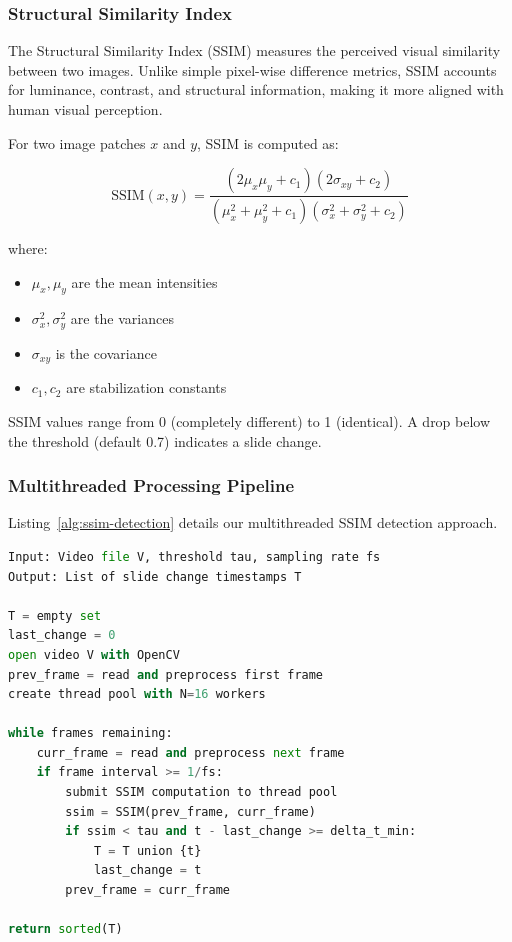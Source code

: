 \documentclass[12pt,a4paper]{article}
\begin{document}
\subsubsection{Structural Similarity Index}

The Structural Similarity Index (SSIM) \cite{wang2004image} measures the perceived visual similarity between two images. Unlike simple pixel-wise difference metrics, SSIM accounts for luminance, contrast, and structural information, making it more aligned with human visual perception.

For two image patches $x$ and $y$, SSIM is computed as:

\begin{equation}
    \text{SSIM}(x, y) = \frac{(2\mu_x\mu_y + c_1)(2\sigma_{xy} + c_2)}{(\mu_x^2 + \mu_y^2 + c_1)(\sigma_x^2 + \sigma_y^2 + c_2)}
\end{equation}

where:
\begin{itemize}
    \item $\mu_x, \mu_y$ are the mean intensities
    \item $\sigma_x^2, \sigma_y^2$ are the variances
    \item $\sigma_{xy}$ is the covariance
    \item $c_1, c_2$ are stabilization constants
\end{itemize}

SSIM values range from 0 (completely different) to 1 (identical). A drop below the threshold (default 0.7) indicates a slide change.

\subsubsection{Multithreaded Processing Pipeline}

Listing~\ref{alg:ssim-detection} details our multithreaded SSIM detection approach.

\begin{lstlisting}[language=Python, caption={Multithreaded SSIM Slide Detection}, label={alg:ssim-detection}]
Input: Video file V, threshold tau, sampling rate fs
Output: List of slide change timestamps T

T = empty set
last_change = 0
open video V with OpenCV
prev_frame = read and preprocess first frame
create thread pool with N=16 workers

while frames remaining:
    curr_frame = read and preprocess next frame
    if frame interval >= 1/fs:
        submit SSIM computation to thread pool
        ssim = SSIM(prev_frame, curr_frame)
        if ssim < tau and t - last_change >= delta_t_min:
            T = T union {t}
            last_change = t
        prev_frame = curr_frame

return sorted(T)
\end{lstlisting}
\end{document}
